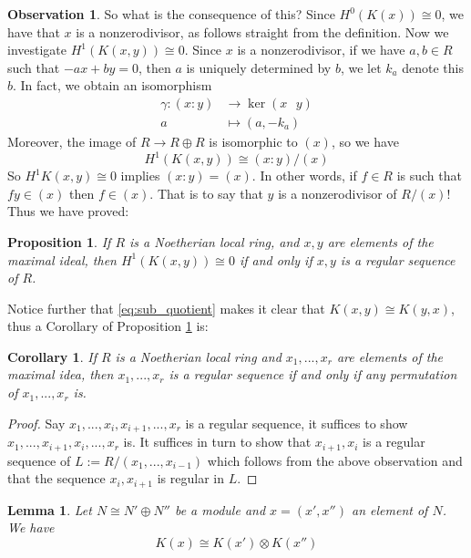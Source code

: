 \documentclass[12pt]{article}
\theoremstyle{plain}
\newtheorem{proposition}[thm]{Proposition}
\newtheorem{lemma}[thm]{Lemma}
\newtheorem{cor}[thm]{Corollary}
\theoremstyle{definition}
\newtheorem{observation}[thm]{Observation}
\newcommand{\lto}{\longrightarrow}
\begin{document}
\begin{observation}
So what is the consequence of this? Since $H^0(K(x)) \cong 0$, we have that $x$ is a nonzerodivisor, as follows straight from the definition. Now we investigate $H^1(K(x,y)) \cong 0$. Since $x$ is a nonzerodivisor, if we have $a,b \in R$ such that $-ax + by = 0$, then $a$ is uniquely determined by $b$, we let $k_a$ denote this $b$. In fact, we obtain an isomorphism
\begin{align*}
\gamma: (x:y) &\lto \operatorname{ker}(x\text{ }y)\\
a &\longmapsto (a,-k_a)
\end{align*}
Moreover, the image of $R \lto R \oplus R$ is isomorphic to $(x)$, so we have
\begin{equation}
H^1(K(x,y)) \cong (x:y)/(x)
\end{equation}
So $H^1K(x,y) \cong 0$ implies $(x:y) = (x)$. In other words, if $f \in R$ is such that $fy \in (x)$ then $f \in (x)$. That is to say that $y$ is a nonzerodivisor of $R/(x)$! Thus we have proved:
\begin{proposition}\label{prop:Zero_KozHom_reg}
If $R$ is a Noetherian local ring, and $x,y$ are elements of the maximal ideal, then $H^1(K(x,y)) \cong 0$ if and only if $x,y$ is a regular sequence of $R$.
\end{proposition}
Notice further that \eqref{eq:sub_quotient} makes it clear that $K(x,y) \cong K(y,x)$, thus a Corollary of Proposition \ref{prop:Zero_KozHom_reg} is:
\begin{cor}
If $R$ is a Noetherian local ring and $x_1,...,x_r$ are elements of the maximal idea, then $x_1,...,x_r$ is a regular sequence if and only if any permutation of $x_1,...,x_r$ is.
\end{cor}
\begin{proof}
Say $x_1,...,x_i,x_{i+1},...,x_r$ is a regular sequence, it suffices to show $x_1,...,x_{i+1},x_i,...,x_r$ is. It suffices in turn to show that $x_{i+1},x_i$ is a regular sequence of $L := R/(x_1,...,x_{i-1})$ which follows from the above observation and that the sequence $x_i,x_{i+1}$ is regular in $L$.
\end{proof}
\end{observation}
\begin{lemma}\label{lem:sum_tens}
Let $N \cong N' \oplus N''$ be a module and $x = (x',x'')$ an element of $N$. We have
\begin{equation}
K(x) \cong K(x') \otimes K(x'')
\end{equation}
\end{lemma}
\end{document}
